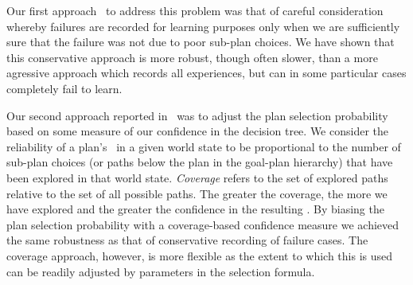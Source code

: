 
Our first approach~\cite{Airiau:IJAT:09} to address this problem was that 
of careful consideration whereby failures are recorded for learning purposes 
only when we are sufficiently sure that the failure was not due to poor
sub-plan choices. 
We have shown that this conservative approach is more robust, 
though often slower, than a more agressive
approach which records all experiences, but can in some particular cases
completely fail to learn.

Our second approach reported in~\cite{Singh:AAMAS10} was to
adjust the plan selection probability based on some measure of 
our confidence in the decision tree.
%
We consider the reliability of a plan's \dt\ in a given 
world state to be proportional to the number of sub-plan choices (or paths
below the plan in the goal-plan hierarchy) that have been
explored in that world state. 
%
{\it Coverage} refers to the set of explored paths relative to the set of all possible paths.
%
The greater the coverage, the more we have explored and the greater the confidence in the resulting \dt.
%
By biasing the plan selection probability with a coverage-based confidence
measure we achieved the same robustness as that of conservative recording of 
failure cases. The coverage approach, however, is more 
flexible as the extent to which this is used can be
readily adjusted by parameters in the selection formula. 


